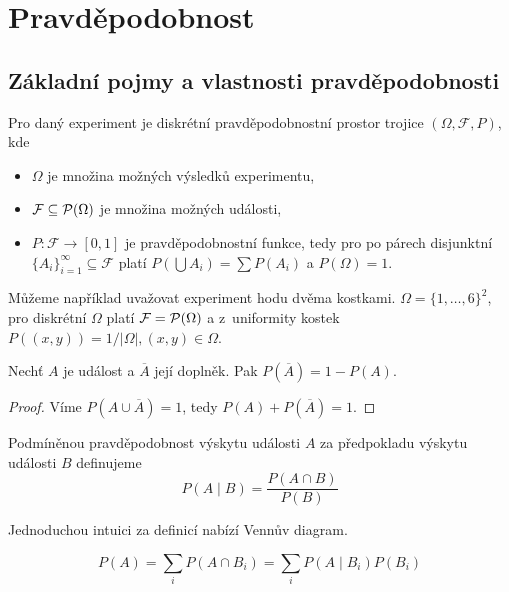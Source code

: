 \section{Pravděpodobnost}

\subsection{Základní pojmy a vlastnosti pravděpodobnosti}

\begin{definition}
Pro daný experiment je diskrétní pravděpodobnostní prostor trojice
$(\Omega, \mathcal{F}, P)$,
kde
\begin{itemize}
    \item $\Omega$ je množina možných výsledků experimentu,
    \item $\mathcal{F} \subseteq \mathcal{P}(\Omega)$ je množina možných události,
    \item $P : \mathcal{F} \to [0,1]$ je pravděpodobnostní funkce, tedy
        pro po párech disjunktní $\{A_i\}_{i=1}^\infty \subseteq \mathcal{F}$ platí
        $P(\bigcup A_i) = \sum P(A_i)$ a $P(\Omega) = 1$.
\end{itemize}
\end{definition}

\begin{example}
    Můžeme například uvažovat experiment hodu dvěma kostkami.
    $\Omega = \{1,\ldots,6\}^2$, pro diskrétní $\Omega$ platí
    $\mathcal{F} = \mathcal{P}(\Omega)$ a z~uniformity kostek
    $P((x,y)) = 1/\lvert \Omega \rvert, (x,y) \in \Omega$.
\end{example}

\begin{claim}
    Nechť $A$ je událost a $\overline{A}$ její doplněk. Pak
    $P(\overline{A}) = 1 - P(A)$.
\end{claim}

\begin{proof}
    Víme $P(A \cup \overline{A}) = 1$, tedy $P(A) + P(\overline{A}) = 1$.
\end{proof}

\begin{definition}
Podmíněnou pravděpodobnost výskytu události $A$ za předpokladu výskytu
události $B$ definujeme
\[
    P(A \mid B) = \frac{P(A \cap B)}{P(B)}
\]
\end{definition}

Jednoduchou intuici za definicí nabízí Vennův diagram.

\begin{theorem}
    \[
        P(A) = \sum_i P(A \cap B_i) = \sum_i P(A \mid B_i) P(B_i)
    \]
\end{theorem}


